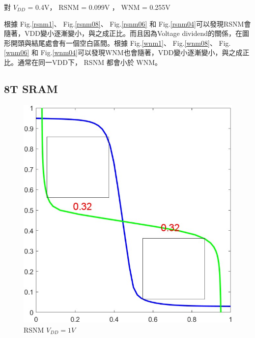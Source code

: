 \documentclass{article}
\begin{document}
\vspace*{-1cm}
對 $V_{DD}$ = 0.4V， RSNM = 0.099V ， WNM = 0.255V


根據 Fig.\ref{rsnm1}、 Fig.\ref{rsnm08}、 Fig.\ref{rsnm06} 和 Fig.\ref{rsnm04}可以發現RSNM會隨著，VDD變小逐漸變小，與之成正比。而且因為Voltage dividend的關係，在圖形開頭與結尾處會有一個空白區間。根據 Fig.\ref{wnm1}、 Fig.\ref{wnm08}、 Fig.\ref{wnm06} 和 Fig.\ref{wnm04}可以發現WNM也會隨著，VDD變小逐漸變小，與之成正比。通常在同一VDD下， RSNM 都會小於 WNM。


\subsection{8T SRAM}


\begin{figure}[H]
\centering
\begin{minipage}[t]{0.28\textwidth}
\centering
    \includegraphics[width=\textwidth]{./img/2023-11-12-04-03-42.png}
\caption{RSNM $V_{DD} = 1V$}
\label{8rsnm1}
\end{minipage}
\qquad
\begin{minipage}[t]{0.28\textwidth}
\centering

\end{minipage}
\end{figure}
\end{document}
